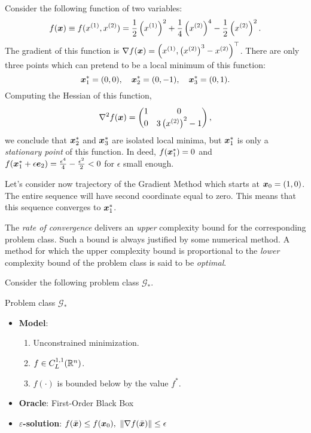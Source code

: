 \begin{example}
    Consider the following function of two variables:
    \[
        f(\bm{x}) \equiv f(x^{(1)}, x^{(2)}) = \frac{1}{2} \left(x^{(1)}\right)^2 + \frac{1}{4} \left(x^{(2)}\right)^4
        - \frac{1}{2}\left(x^{(2)}\right)^2. 
    \]
    The gradient of this function is \(\nabla f(\bm{x}) = \left(x^{(1)}, \left(x^{(2)}\right)^3 - x^{(2)}\right)^\top\).
    There are only three points which can pretend to be a local minimum of this function:
    \[
        \bm{x}_1^* = (0,0), \quad \bm{x}_2^* = (0, -1), \quad \bm{x}_3^* = (0, 1).  
    \]
    Computing the Hessian of this function,
    \[
        \hess f(\xB) = \begin{pmatrix}
            1 & 0 \\
            0 & 3\left(x^{(2)}\right)^2 - 1
        \end{pmatrix},  
    \]
    we conclude that \(\bm{x}^*_2\) and \(\bm{x}^*_3\) are isolated local minima, but \(\bm{x}_1^*\) is only a \emph{stationary point} of this function.
    In deed, \(f(\bm{x}^*_1) = 0\) and \(f(\bm{x}_1^* + \epsilon \bm{e}_2) = \frac{\epsilon^4}{4} - \frac{\epsilon^2}{2} < 0\) for \(\epsilon\) small enough.

    Let's consider now trajectory of the Gradient Method which starts at \(\bm{x}_0 = (1, 0)\). The entire sequence will have second coordinate equal to zero.
    This means that this sequence converges to \(\bm{x}^*_1\).
\end{example}

The \emph{rate of convergence} delivers an \emph{upper} complexity bound for the corresponding problem class. Such a bound is always justified by some numerical method.
A method for which the upper complexity bound is proportional to the \emph{lower} complexity bound of the problem class is said to be \emph{optimal}.

Consider the following problem class \(\mathscr{G}_*\).
\begin{boxnote}{Problem class \(\mathscr{G}_*\)}
    \begin{itemize}
        \item \textbf{Model}: 
            \begin{enumerate}
                \item Unconstrained minimization.
                \item \(f \in C^{1, 1}_L(\mathbb{R}^n)\).
                \item \(f(\cdot)\) is bounded below by the value \(f^*\).
            \end{enumerate}
        \item \textbf{Oracle}: First-Order Black Box
        \item \textbf{\(\varepsilon\)-solution}: \(f(\bar{\bm{x}}) \le f(\bm{x}_0),~\norm{\nabla f(\bar{\bm{x}})} \le \epsilon\)
    \end{itemize}
\end{boxnote}

